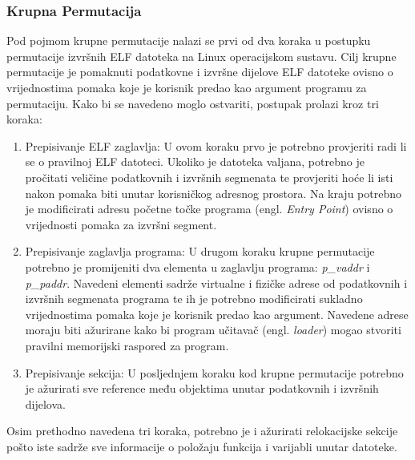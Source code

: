 \documentclass[times, utf8, diplomski, numeric]{fer}
\begin{document}
\subsubsection{Krupna Permutacija}
Pod pojmom krupne permutacije nalazi se prvi od dva koraka u postupku permutacije izvršnih ELF datoteka na Linux operacijskom sustavu. Cilj krupne permutacije je pomaknuti podatkovne i izvršne dijelove ELF datoteke ovisno o vrijednostima pomaka koje je korisnik predao kao argument programu za permutaciju. Kako bi se navedeno moglo ostvariti, postupak prolazi kroz tri koraka:
\begin{enumerate}
\item Prepisivanje ELF zaglavlja: U ovom koraku prvo je potrebno provjeriti radi li se o pravilnoj ELF datoteci. Ukoliko je datoteka valjana, potrebno je pročitati veličine podatkovnih i izvršnih segmenata te provjeriti hoće li isti nakon pomaka biti unutar korisničkog adresnog prostora. Na kraju potrebno je modificirati adresu početne točke programa (engl. \emph{Entry Point}) ovisno o vrijednosti pomaka za izvršni segment.
\item Prepisivanje zaglavlja programa: U drugom koraku krupne permutacije potrebno je promijeniti dva elementa u zaglavlju programa: \emph{p\_vaddr} i \emph{p\_paddr}. Navedeni elementi sadrže virtualne i fizičke adrese od podatkovnih i izvršnih segmenata programa te ih je potrebno modificirati sukladno vrijednostima pomaka koje je korisnik predao kao argument. Navedene adrese moraju biti ažurirane kako bi program učitavač (engl. \emph{loader}) mogao stvoriti pravilni memorijski raspored za program.
\item Prepisivanje sekcija: U posljednjem koraku kod krupne permutacije potrebno je ažurirati sve reference među objektima unutar podatkovnih i izvršnih dijelova. 
\end{enumerate}
Osim prethodno navedena tri koraka, potrebno je i ažurirati relokacijske sekcije pošto iste sadrže sve informacije o položaju funkcija i varijabli unutar datoteke.
\end{document}
